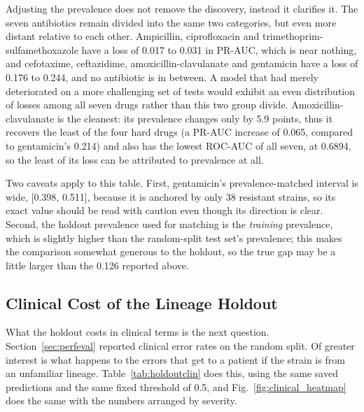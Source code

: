 \documentclass[journal]{IEEEtran}
\begin{document}
Adjusting the prevalence does not remove the discovery, instead it clarifies it. The
seven antibiotics remain divided into the same two categories, but even more distant
relative to each other. Ampicillin, ciprofloxacin and trimethoprim-sulfamethoxazole
have a loss of 0.017 to 0.031 in PR-AUC, which is near nothing, and cefotaxime,
ceftazidime, amoxicillin-clavulanate and gentamicin have a loss of 0.176 to 0.244,
and no antibiotic is in between. A model that had merely deteriorated on a more
challenging set of tests would exhibit an even distribution of losses among all seven
drugs rather than this two group divide. Amoxicillin-clavulanate is the cleanest: its
prevalence changes only by 5.9 points, thus it recovers the least of the four hard
drugs (a PR-AUC increase of 0.065, compared to gentamicin's 0.214) and also has the
lowest ROC-AUC of all seven, at 0.6894, so the least of its loss can be attributed to
prevalence at all.

Two caveats apply to this table. First, gentamicin's prevalence-matched interval is
wide, [0.398, 0.511], because it is anchored by only 38 resistant strains, so its
exact value should be read with caution even though its direction is clear. Second,
the holdout prevalence used for matching is the \textit{training} prevalence, which
is slightly higher than the random-split test set's prevalence; this makes the
comparison somewhat generous to the holdout, so the true gap may be a little larger
than the 0.126 reported above.

\subsection{Clinical Cost of the Lineage Holdout}

What the holdout costs in clinical terms is the next question.
Section~\ref{sec:perfeval} reported clinical error rates on the random split. Of
greater interest is what happens to the errors that get to a patient if the strain is
from an unfamiliar lineage. Table~\ref{tab:holdoutclin} does this, using the same
saved predictions and the same fixed threshold of 0.5, and
Fig.~\ref{fig:clinical_heatmap} does the same with the numbers arranged by
severity.
\end{document}
